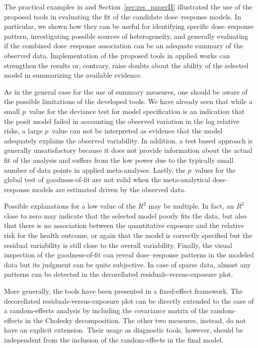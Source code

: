 \documentclass[11pt,a4paper,twoside,openany]{book}\usepackage{knitr}
\begin{document}
{The practical examples in  and Section~\ref{sec:res_paperII} illustrated the use of the proposed tools in evaluating the fit of the candidate dose--response models. In particular, we shown how they can be useful for identifying specific dose--response pattern, investigating possible sources of heterogeneity, and generally evaluating if the combined dose--response association can be an adequate summary of the observed data. Implementation of the proposed tools in applied works can strengthen the results or, contrary, raise doubts about the ability of the selected model in summarizing the available evidence. 

\noindent As in the general case for the use of summary measures, one should be aware of the possible limitations of the developed tools.
We have already seen that while a small $p$~value for the deviance test for model specification is an indication that the posit model failed in accounting the observed variation in the log relative risks, a large $p$~value can not be interpreted as evidence that the model adequately explains the observed variability. In addition, a test based approach is generally unsatisfactory because it does not provide information about the actual fit of the analysis and suffers from the low power due to the typically small number of data points in applied meta-analyses. Lastly, the $p$~values for the global test of goodness-of-fit are not valid when the meta-analytical dose--response models are estimated driven by the observed data.

Possible explanations for a low value of the $R^2$ may be multiple. In fact, an $R^2$ close to zero may indicate that the selected model poorly fits the data, but also that there is no association between the quantitative exposure and the relative risk for the health outcome, or again that the model is correctly specified but the residual variability is still close to the overall variability. Finally, the visual inspection of the goodness-of-fit can reveal dose--response patterns in the modeled data but its judgment can be quite subjective. In case of sparse data, almost any patterns can be detected in the decorellated residuals-versus-exposure plot.

More generally, the tools have been presented in a fixed-effect framework. The decorellated residuals-versus-exposure plot can be directly extended to the case of a random-effects analysis by including the covariance matrix of the random-effects in the Cholesky decomposition. The other two measures, instead, do not have an explicit extension. Their usage as diagnostic tools, however, should be independent from the inclusion of the random-effects in the final model.


}
\end{document}

